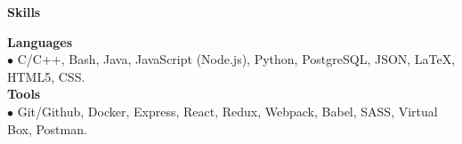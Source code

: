\documentclass[11pt]{article}
\newcommand{\sectionheader}[1]{\noindent \textbf{\large #1}}
\newenvironment{sectionbody}{\begin{adjustwidth}{6mm}{}}{\end{adjustwidth}}
\begin{document}
\vspace{2mm}

\sectionheader{Skills}
\begin{sectionbody}
{\bf Languages} \\
    $\bullet$ C/C++, Bash, Java, JavaScript (Node.js), Python, PostgreSQL, JSON, \LaTeX, HTML5, CSS. \\
{\bf Tools} \\
$\bullet$ Git/Github, Docker, Express, React, Redux, Webpack, Babel, SASS, Virtual Box, Postman.
\end{sectionbody}
\end{document}
